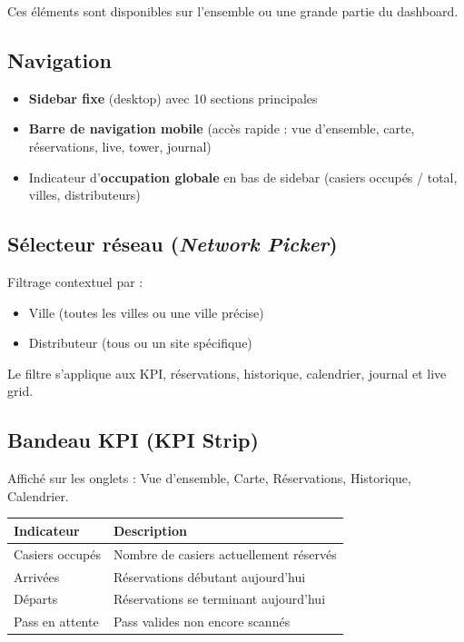 \documentclass[11pt,a4paper]{article}
\begin{document}
Ces éléments sont disponibles sur l'ensemble ou une grande partie du dashboard.

\subsection{Navigation}
\begin{itemize}
  \item \textbf{Sidebar fixe} (desktop) avec 10 sections principales
  \item \textbf{Barre de navigation mobile} (accès rapide : vue d'ensemble, carte, réservations, live, tower, journal)
  \item Indicateur d'\textbf{occupation globale} en bas de sidebar (casiers occupés / total, villes, distributeurs)
\end{itemize}

\subsection{Sélecteur réseau (\textit{Network Picker})}
Filtrage contextuel par :
\begin{itemize}[noitemsep]
  \item Ville (toutes les villes ou une ville précise)
  \item Distributeur (tous ou un site spécifique)
\end{itemize}
Le filtre s'applique aux KPI, réservations, historique, calendrier, journal et live grid.

\subsection{Bandeau KPI (KPI Strip)}
Affiché sur les onglets : Vue d'ensemble, Carte, Réservations, Historique, Calendrier.
\begin{center}
\begin{tabular}{ll}
  \toprule
  \textbf{Indicateur} & \textbf{Description} \\
  \midrule
  Casiers occupés & Nombre de casiers actuellement réservés \\
  Arrivées & Réservations débutant aujourd'hui \\
  Départs & Réservations se terminant aujourd'hui \\
  Pass en attente & Pass valides non encore scannés \\
  \bottomrule
\end{tabular}
\end{center}
\end{document}
